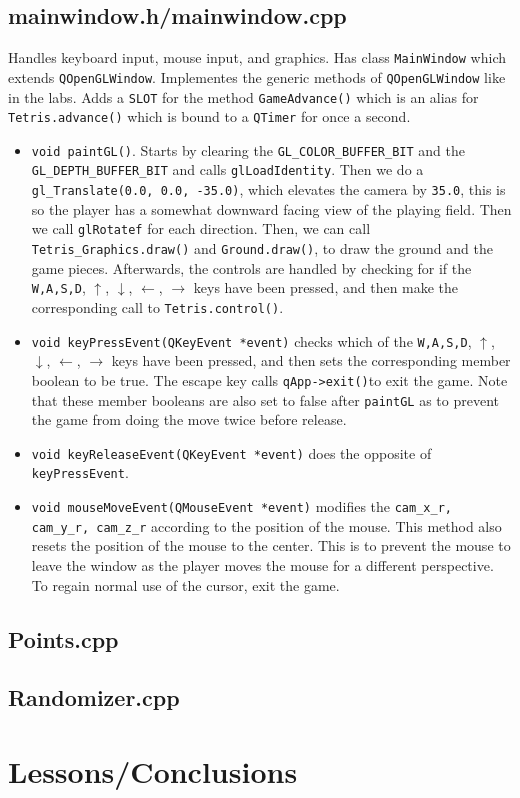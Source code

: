 \documentclass[letterpaper, 12pt]{article}
\begin{document}
\subsection{mainwindow.h/mainwindow.cpp}
Handles keyboard input, mouse input, and graphics.
Has class \verb|MainWindow| which extends \verb|QOpenGLWindow|.
Implementes the generic methods of \verb|QOpenGLWindow| like in the labs.
Adds a \verb|SLOT| for the method \verb|GameAdvance()| which is an alias for \verb|Tetris.advance()| which is bound to a \verb|QTimer| for once a second.
\begin{itemize}
    \item \verb|void paintGL()|.
        Starts by clearing the \verb|GL_COLOR_BUFFER_BIT| and the \verb|GL_DEPTH_BUFFER_BIT| and calls \verb|glLoadIdentity|.
        Then we do a \verb|gl_Translate(0.0, 0.0, -35.0)|, which elevates the camera by \verb|35.0|, this is so the player has a somewhat downward facing view of the playing field.
        Then we call \verb|glRotatef| for each direction.
        Then, we can call \verb|Tetris_Graphics.draw()| and \verb|Ground.draw()|, to draw the ground and the game pieces.
        Afterwards, the controls are handled by checking for if the \verb|W,A,S,D|, $\uparrow$, $\downarrow$, $\leftarrow$, $\rightarrow$ keys have been pressed, and then make the corresponding call to \verb|Tetris.control()|.
    \item \verb|void keyPressEvent(QKeyEvent *event)| checks which of the \verb|W,A,S,D|, $\uparrow$, $\downarrow$, $\leftarrow$, $\rightarrow$ keys have been pressed, and then sets the corresponding member boolean to be true.
        The escape key calls \verb|qApp->exit()|to exit the game.
        Note that these member booleans are also set to false after \verb|paintGL| as to prevent the game from doing the move twice before release.
    \item \verb|void keyReleaseEvent(QKeyEvent *event)| does the opposite of \verb|keyPressEvent|.
    \item \verb|void mouseMoveEvent(QMouseEvent *event)| modifies the \verb|cam_x_r, cam_y_r, cam_z_r| according to the position of the mouse.
        This method also resets the position of the mouse to the center.
        This is to prevent the mouse to leave the window as the player moves the mouse for a different perspective.
        To regain normal use of the cursor, exit the game.
\end{itemize}
\subsection{Points.cpp}
\subsection{Randomizer.cpp}
\section{Lessons/Conclusions}
\end{document}
